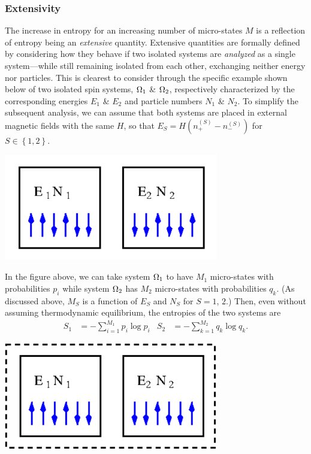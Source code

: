 \subsubsection{Extensivity}
The increase in entropy for an increasing number of micro-states $M$ is a reflection of entropy being an \textit{extensive} quantity.
Extensive quantities are formally defined by considering how they behave if two isolated systems are \textit{analyzed} as a single system---while still remaining isolated from each other, exchanging neither energy nor particles.
This is clearest to consider through the specific example shown below of two isolated spin systems, $\Omega_1$ \& $\Omega_2$, respectively characterized by the corresponding energies $E_1$ \& $E_2$ and particle numbers $N_1$ \& $N_2$.
To simplify the subsequent analysis, we can assume that both systems are placed in external magnetic fields with the same $H$, so that $E_S = H\left(n_+^{(S)} - n_-^{(S)}\right)$ for $S \in \left\{1, 2\right\}$.
\begin{center}
  \includegraphics[width=0.7\textwidth]{figs/unit02_entropy-separate.pdf}
\end{center}

In the figure above, we can take system $\Omega_1$ to have $M_1$ micro-states with probabilities $p_i$ while system $\Omega_2$ has $M_2$ micro-states with probabilities $q_k$.
(As discussed above, $M_S$ is a function of $E_S$ and $N_S$ for $S = 1$, $2$.)
Then, even without assuming thermodynamic equilibrium, the entropies of the two systems are
\begin{align*}
  S_1 & = - \sum_{i = 1}^{M_1} p_i \log p_i &
  S_2 & = - \sum_{k = 1}^{M_2} q_k \log q_k.
\end{align*}

\begin{center}
  \includegraphics[width=0.7\textwidth]{figs/unit02_entropy-combo.pdf}
\end{center}

